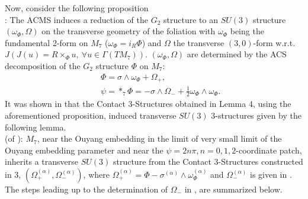\documentclass[a4paper,11pt,fleqn]{article}
\theoremstyle{plain}
\theoremstyle{definition}
\begin{document}
Now, consider the following proposition\\
 \cite{Ossa et al[2013]}:
The ACMS induces a reduction of the $G_2$ structure to an $SU(3)$ structure $(\omega_\Phi, \Omega)$ on the transverse geometry of the foliation with $\omega_{\Phi}$ being the fundamental 2-form on $M_7$ ($\omega_\Phi = i_R\Phi$) and $\Omega$  the transverse $(3,0)$-form w.r.t. $J (J(u) = R\times_\Phi u,\ \forall u\in\Gamma(T M_7))$.
$(\omega_\Phi, \Omega)$ are determined by the ACS decomposition of the $G_2$ structure $\Phi$ on $M_7$:
\begin{eqnarray}
\label{Transverse-conditions}
& & \Phi = \sigma\wedge\omega_\Phi + \Omega_+,\nonumber\\
& & \psi = *_7\Phi = - \sigma\wedge\Omega_- + \frac{1}{2}\omega_\Phi\wedge\omega_\Phi.
\end{eqnarray}
It was shown in \cite{ACMS} that the Contact 3-Structures obtained in Lemma 4, using the aforementioned proposition, induced transverse $SU(3)$ 3-structures given by the following lemma.\\
(of \cite{ACMS}): $M_7$, near the Ouyang embedding in the limit of very small limit of the Ouyang embedding parameter and near the $\psi=2n\pi, n=0, 1, 2$-coordinate patch, inherits a transverse $SU(3)$ structure from the Contact 3-Structures constructed in 3, $\left(\Omega_+^{(\alpha)},\Omega_-^{(\alpha)}\right)$,
where $\Omega_+^{(\alpha)} = \Phi - \sigma^{(\alpha)}\wedge\omega_\Phi^{(\alpha)}$ and $\Omega_-^{(\alpha)}$ is given in \cite{ACMS}. The steps leading up to the determination of $\Omega_-$ in \cite{ACMS}, are summarized below.
\end{document}
